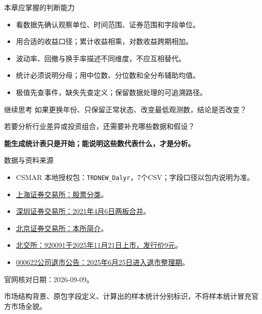 \documentclass[9pt]{ctexbeamer}
\begin{document}
\begin{frame}{本章应掌握的判断能力}
  \begin{itemize}
    \item 看数据先确认观察单位、时间范围、证券范围和字段单位。
    \item 用合适的收益口径；累计收益相乘，对数收益跨期相加。
    \item 波动率、回撤与换手率描述不同维度，不应互相替代。
    \item 统计必须说明分母；用中位数、分位数和全分布辅助均值。
    \item 极值先查事件，缺失先查定义；保留数据处理的可追溯路径。
  \end{itemize}
  \begin{block}{继续思考}
    如果更换年份、只保留正常状态、改变最低观测数，结论是否改变？\par
    若要分析行业差异或投资组合，还需要补充哪些数据和假设？
  \end{block}
  \textbf{能生成统计表只是开始；能说明这些数代表什么，才是分析。}
\end{frame}

\begin{frame}{数据与资料来源}
  \small
  \begin{itemize}
    \item CSMAR 本地授权包：\texttt{TRDNEW\_Dalyr}，7个CSV；字段口径以包内说明为准。
    \item \href{https://star.sse.com.cn/assortment/stock/list/share/}{上海证券交易所：股票分类}。
    \item \href{https://www.szse.cn/aboutus/trends/news/t20210406_585442.html}{深圳证券交易所：2021年4月6日两板合并}。
    \item \href{https://www.bse.cn/company/introduce.html}{北京证券交易所：本所简介}。
    \item \href{https://www.bse.cn/issue_report_meeting/200027211.html}{北交所：920091于2025年11月21日上市，发行价9元}。
    \item \href{https://disc.static.szse.cn/disc/disk03/finalpage/2025-06-19/ac36f03f-1bba-480d-9012-df4c030c22cb.PDF}{000622公司退市公告：2025年6月25日进入退市整理期}。
  \end{itemize}
  \vspace{0.3cm}
  官网核对日期：2026-09-09。\par
  市场结构背景、原包字段定义、计算出的样本统计分别标识，不将样本统计冒充官方市场全貌。
\end{frame}
\end{document}
